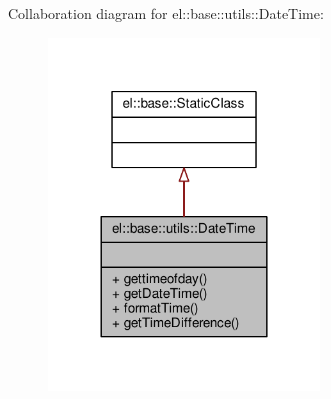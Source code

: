Collaboration diagram for el\+:\+:base\+:\+:utils\+:\+:Date\+Time\+:
\nopagebreak
\begin{figure}[H]
\begin{center}
\leavevmode
\includegraphics[width=204pt]{df/d0d/classel_1_1base_1_1utils_1_1DateTime__coll__graph}
\end{center}
\end{figure}

